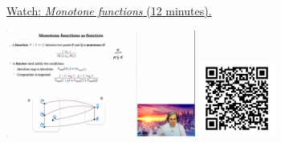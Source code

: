 
\begin{minipage}{10cm}
    \href{https://act4e-spring21.netlify.app/videos/spring2021-functors:semi-and-fun:mon-functions.html}{Watch: \emph{Monotone functions} (12 minutes).}
        
    \href{https://act4e-spring21.netlify.app/videos/spring2021-functors:semi-and-fun:mon-functions.html}{\includegraphics[height=3.5cm]{spring2021-functors:semi-and-fun:mon-functions/thumbnails.jpg}}
    \href{https://act4e-spring21.netlify.app/videos/spring2021-functors:semi-and-fun:mon-functions.html}{\includegraphics[height=2.5cm]{spring2021-functors:semi-and-fun:mon-functions/qrcode.png}}
\end{minipage}
